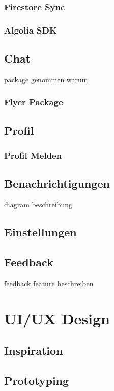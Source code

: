 \subsubsection{Firestore Sync}

\subsubsection{Algolia SDK}


\subsection{Chat}
package genommen warum
\subsubsection{Flyer Package}
\subsection{Profil}
\subsubsection{Profil Melden}

\subsection{Benachrichtigungen}
diagram beschreibung
\subsection{Einstellungen}
\subsection{Feedback}
\author{Martin Hausleitner}
feedback feature beschreiben


\section{UI/UX Design}
\author{Martin Hausleitner}

\subsection{Inspiration}

\subsection{Prototyping}
